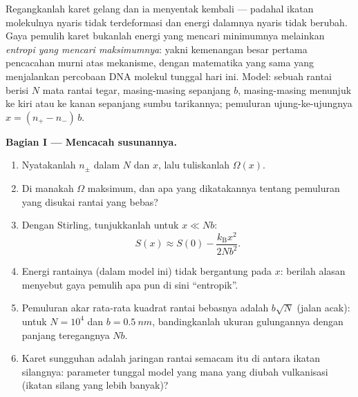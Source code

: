\begin{problem}\label{pb:b3:microcanonical-ensemble:1}
Regangkanlah karet gelang dan ia menyentak kembali --- padahal ikatan
molekulnya nyaris tidak terdeformasi dan energi dalamnya nyaris tidak
berubah. Gaya pemulih karet bukanlah energi yang mencari minimumnya
melainkan \emph{entropi yang mencari maksimumnya}: yakni kemenangan besar
pertama pencacahan murni atas mekanisme, dengan matematika yang sama yang
menjalankan percobaan DNA molekul tunggal hari ini. Model: sebuah rantai
berisi $N$ mata rantai tegar, masing-masing sepanjang $b$, masing-masing
menunjuk ke kiri atau ke kanan sepanjang sumbu tarikannya; pemuluran
ujung-ke-ujungnya $x = (n_+ - n_-)\,b$.

\medskip\noindent\textbf{Bagian I --- Mencacah susunannya.}
\begin{enumerate}
  \item Nyatakanlah $n_\pm$ dalam $N$ dan $x$, lalu tuliskanlah
         $\Omega(x)$.
  \item Di manakah $\Omega$ maksimum, dan apa yang dikatakannya tentang
        pemuluran yang disukai rantai yang bebas?
  \item Dengan Stirling, tunjukkanlah untuk $x \ll Nb$:
        \[
        S(x) \approx S(0) - \frac{k_{\text{B}}x^2}{2Nb^2} .
        \]
  \item Energi rantainya (dalam model ini) tidak bergantung pada $x$:
        berilah alasan menyebut gaya pemulih apa pun di sini
        ``entropik''.
  \item Pemuluran akar rata-rata kuadrat rantai bebasnya adalah
        $b\sqrt N$ (jalan acak): untuk $N = 10^4$ dan $b = \qty{0.5}{nm}$,
        bandingkanlah ukuran gulungannya dengan panjang teregangnya $Nb$.
  \item Karet sungguhan adalah jaringan rantai semacam itu di antara
        ikatan silangnya: parameter tunggal model yang mana yang diubah
        vulkanisasi (ikatan silang yang lebih banyak)?
\end{enumerate}


\end{problem}

